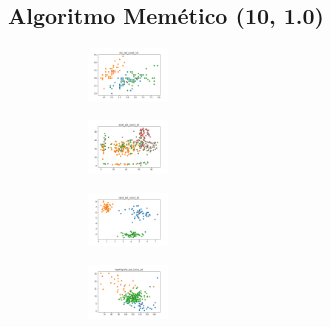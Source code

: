 \vspace*{\fill}
\newpage


\subsection{Algoritmo Memético (10, 1.0)}

\begin{figure}[H]    
    \centering
    \begin{subfigure}
        \centering
        \includegraphics[width=0.234\textwidth]{img/am10/iris_set_const_10_949004259_clust.png}
    \end{subfigure}
    \hfill
    \begin{subfigure}
        \centering
        \includegraphics[width=0.234\textwidth]{img/am10/ecoli_set_const_10_949004259_clust.png}
    \end{subfigure}
    \hfill
    \begin{subfigure}
        \centering
        \includegraphics[width=0.234\textwidth]{img/am10/rand_set_const_10_949004259_clust.png}
    \end{subfigure}
    \hfill
    \begin{subfigure}
        \centering
        \includegraphics[width=0.234\textwidth]{img/am10/newthyroid_set_const_10_949004259_clust.png}

\end{subfigure}
\end{figure}
